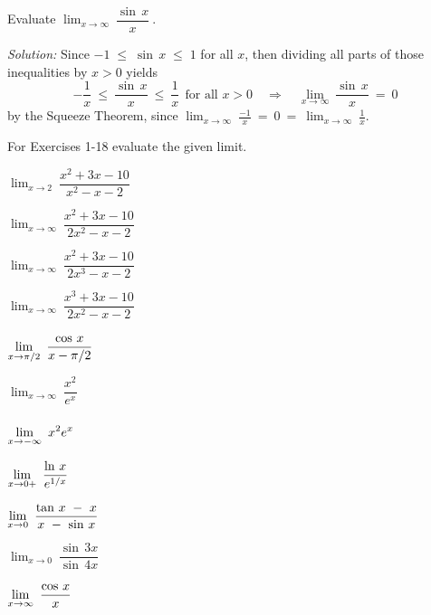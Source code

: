 \begin{exmp}\label{exmp:squeeze}
\noindent Evaluate $\displaystyle\lim_{x \to \infty}~\dfrac{\sin\,x}{x}~$.\vspace{1mm}
\par\noindent\emph{Solution:} Since $-1 \;\le\; \sin\,x \;\le\; 1$ for all $x$,
then dividing all parts of those inequalities by $x > 0$ yields
\[
-\frac{1}{x} ~\le~ \frac{\sin\,x}{x} ~\le~ \frac{1}{x} ~~\text{for all $x > 0$}
\quad\Rightarrow\quad \lim_{x \to \infty}~\frac{\sin\,x}{x} ~=~ 0
\]
by the Squeeze Theorem, since $\displaystyle\lim_{x \to \infty}~\frac{-1}{x} ~=~
0 ~=~ \displaystyle\lim_{x \to \infty}~\frac{1}{x}$.
\end{exmp}
\divider
\newpage
\startexercises\label{sec3dot2}
{\small
{}
\par\noindent For Exercises 1-18 evaluate the given limit.
\begin{enumerate}[\bfseries 1.]
 \begin{multicols}{4}
  \item $\displaystyle\lim_{x \to 2}~ \dfrac{x^2 + 3x - 10}{x^2 - x - 2}$
  \item $\displaystyle\lim_{x \to \infty}~ \dfrac{x^2 + 3x - 10}{2x^2 - x - 2}$
  \item $\displaystyle\lim_{x \to \infty}~ \dfrac{x^2 + 3x - 10}{2x^3 - x - 2}$
  \item $\displaystyle\lim_{x \to \infty}~ \dfrac{x^3 + 3x - 10}{2x^2 - x - 2}$
 \end{multicols}
 \begin{multicols}{4}
  \item $\displaystyle\lim_{x \to \pi/2}~ \dfrac{\cos\,x}{x - \pi/2}\vphantom{\dfrac{x^2}{e^x}}$
  \item $\displaystyle\lim_{x \to \infty}~ \dfrac{x^2}{e^x}$
  \item $\displaystyle\lim_{x \to -\infty}~ x^2 e^x\vphantom{\dfrac{x^2}{e^x}}$
  \item $\displaystyle\lim_{x \to 0+}~ \dfrac{\ln\,x}{e^{1/x}}\vphantom{\dfrac{x^2}{e^x}}$
 \end{multicols}
 \begin{multicols}{4}
  \item $\displaystyle\lim_{x \to 0}~ \dfrac{\tan\,x ~-~ x}{x ~-~ \sin\,x}\vphantom{\dfrac{\sin\,3x}{\sin\,4x}}$
  \item $\displaystyle\lim_{x \to 0}~ \dfrac{\sin\,3x}{\sin\,4x}$
  \item $\displaystyle\lim_{x \to \infty}~ \dfrac{\cos\,x}{x}\vphantom{\dfrac{\sin\,3x}{\sin\,4x}}$

\end{multicols}
\end{enumerate}}
